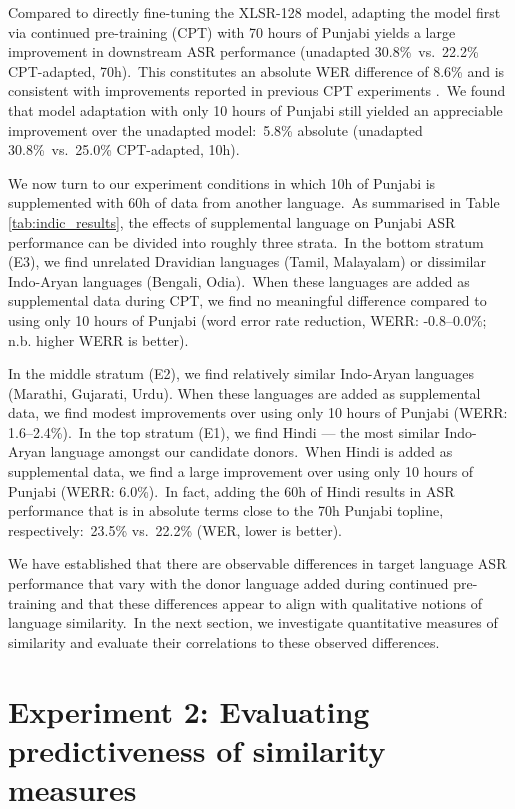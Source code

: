 \documentclass[main.tex]{subfiles}
\begin{document}
Compared to directly fine-tuning the XLSR-128 model, adapting the model first via continued pre-training (CPT) with 70 hours of Punjabi yields a large improvement in downstream ASR performance (unadapted 30.8\%~vs.~22.2\% CPT-adapted, 70h).~This constitutes an absolute WER difference of 8.6\% and is consistent with improvements reported in previous CPT experiments \cite[][]{NOWAKOWSKI2023103148,paraskevopoulos2024sample}.~We found that model adaptation with only 10 hours of Punjabi still yielded an appreciable improvement over the unadapted model:~5.8\% absolute (unadapted 30.8\%~vs.~25.0\% CPT-adapted, 10h).

We now turn to our experiment conditions in which 10h of Punjabi is supplemented with 60h of data from another language.~As summarised in Table \ref{tab:indic_results}, the effects of supplemental language on Punjabi ASR performance can be divided into roughly three strata.~In the bottom stratum (E3), we find unrelated Dravidian languages (Tamil, Malayalam) or dissimilar Indo-Aryan languages (Bengali, Odia).~When these languages are added as supplemental data during CPT, we find no meaningful difference compared to using only 10 hours of Punjabi (word error rate reduction, WERR: -0.8--0.0\%; n.b. higher WERR is better).

In the middle stratum (E2), we find relatively similar Indo-Aryan languages (Marathi, Gujarati, Urdu). When these languages are added as supplemental data, we find modest improvements over using only 10 hours of Punjabi (WERR: 1.6--2.4\%).~In the top stratum (E1), we find Hindi --- the most similar Indo-Aryan language amongst our candidate donors.~When Hindi is added as supplemental data, we find a large improvement over using only 10 hours of Punjabi (WERR: 6.0\%).~In fact, adding the 60h of Hindi results in ASR performance that is in absolute terms close to the 70h Punjabi topline, respectively:~23.5\% vs.~22.2\% (WER, lower is better).

We have established that there are observable differences in target language ASR performance that vary with the donor language added during continued pre-training and that these differences appear to align with qualitative notions of language similarity.~In the next section, we investigate quantitative measures of similarity and evaluate their correlations to these observed differences.

\section{Experiment 2: Evaluating predictiveness of similarity measures}
\label{sec:sigtyp:atds}
\end{document}
